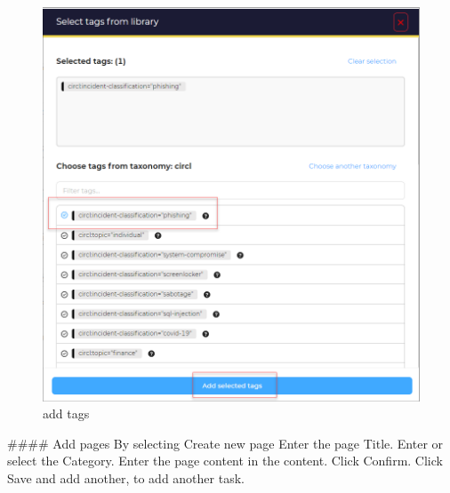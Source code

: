 \begin{figure}[H]
    \centering
    \includegraphics[width=\textwidth]{images/docs/analyst/cases/addition/select_tags.png}
    \caption{add tags}
    \label{fig:modules}
\end{figure}
\begin{markdown}

#### Add pages
By selecting Create new page
Enter the page Title.
Enter or select the Category.
Enter the page content in the content.
Click Confirm.
Click Save and add another, to add another task.
\end{markdown}



